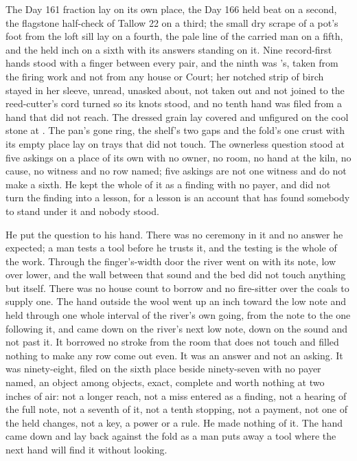 The Day 161 fraction lay on its own place, the Day 166 held beat on a second, the flagstone half-check of Tallow 22 on a third; the small dry scrape of a pot's foot from the loft sill lay on a fourth, the pale line of the carried man on a fifth, and the held inch on a sixth with its answers standing on it. Nine record-first hands stood with a finger between every pair, and the ninth was 's, taken from the firing work and not from any house or Court; her notched strip of birch stayed in her sleeve, unread, unasked about, not taken out and not joined to the reed-cutter's cord turned so its knots stood, and no tenth hand was filed from a hand that did not reach. The dressed grain lay covered and unfigured on the cool stone at . The pan's gone ring, the shelf's two gaps and the fold's one crust with its empty place lay on trays that did not touch. The ownerless question stood at five askings on a place of its own with no owner, no room, no hand at the kiln, no cause, no witness and no row named; five askings are not one witness and do not make a sixth. He kept the whole of it as a finding with no payer, and did not turn the finding into a lesson, for a lesson is an account that has found somebody to stand under it and nobody stood.

He put the question to his hand. There was no ceremony in it and no answer he expected; a man tests a tool before he trusts it, and the testing is the whole of the work. Through the finger's-width door the river went on with its note, low over lower, and the wall between that sound and the bed did not touch anything but itself. There was no house count to borrow and no fire-sitter over the coals to supply one. The hand outside the wool went up an inch toward the low note and held through one whole interval of the river's own going, from the note to the one following it, and came down on the river's next low note, down on the sound and not past it. It borrowed no stroke from the room that does not touch and filled nothing to make any row come out even. It was an answer and not an asking. It was ninety-eight, filed on the sixth place beside ninety-seven with no payer named, an object among objects, exact, complete and worth nothing at two inches of air: not a longer reach, not a miss entered as a finding, not a hearing of the full note, not a seventh of it, not a tenth stopping, not a payment, not one of the held changes, not a key, a power or a rule. He made nothing of it. The hand came down and lay back against the fold as a man puts away a tool where the next hand will find it without looking.

